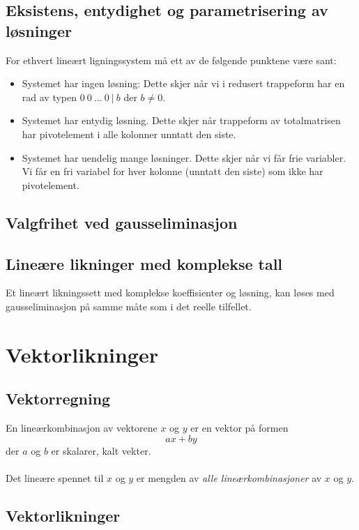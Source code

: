\documentclass{article}
\begin{document}
\subsection{Eksistens, entydighet og parametrisering av løsninger}
For ethvert lineært ligningssystem må ett av de følgende punktene være sant:
\begin{itemize}
    \item Systemet har ingen løsning: Dette skjer når vi i redusert trappeform har en rad av typen $ 0 \ 0 \ ... \ 0 \ | \ b $ der $b \neq 0$.
    \item Systemet har entydig løsning. Dette skjer når trappeform av totalmatrisen har pivotelement i alle kolonner unntatt den siste.
    \item Systemet har uendelig mange løsninger. Dette skjer når vi får frie variabler. Vi får en fri variabel for hver kolonne (unntatt den siste) som ikke har pivotelement.
\end{itemize}


\subsection{Valgfrihet ved gausseliminasjon}


\subsection{Lineære likninger med komplekse tall}
Et lineært likningssett med komplekse koeffisienter og løsning, kan løses med gausseliminasjon på samme måte som i det reelle tilfellet.




\clearpage
\section{Vektorlikninger}


\subsection{Vektorregning}
En lineærkombinasjon av vektorene $x$ og $y$ er en vektor på formen
\[ax + by\]
der $a$ og $b$ er skalarer, kalt vekter.
\\\\
Det lineære spennet til $x$ og $y$ er mengden av \textit{alle lineærkombinasjoner} av $x$ og $y$.


\subsection{Vektorlikninger}
\end{document}
